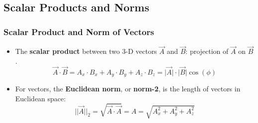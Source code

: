 \subsection{Scalar Products and Norms}
\subsubsection{Scalar Product and Norm of Vectors}
\begin{itemize}
\item The \textbf{scalar product} between two 3-D vectors $\vec{A}$ and $\vec{B}$: projection of $\vec{A}$ on $\vec{B}$.
\[ \vec{A} \cdot \vec{B} = A_{x} \cdot B_{x} + A_{y} \cdot B_{y} + A_{z} \cdot B_{z} = \lvert \vec{A} \rvert \cdot \lvert \vec{B} \lvert \cos(\phi) \]
 \item For vectors, the \textbf{Euclidean norm}, or \textbf{norm-2}, is the length of vectors in Euclidean space:
 \[ \lvert \lvert \vec{A} \rvert \rvert_{2} = \sqrt{\vec{A} \cdot \vec{A}} = A = \sqrt{A_{x}^2+A_{y}^2+A_{z}^2} \]
 \end{itemize}
